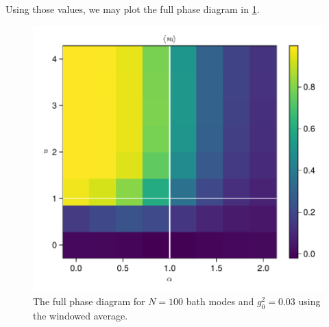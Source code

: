 \documentclass[fontsize=10pt,paper=b5,open=any,
twoside=no,toc=listof,toc=bibliography,headings=optiontohead,
captions=nooneline,captions=tableabove,english,DIV=15,numbers=noenddot,final,parskip=half-,
headinclude=true,footinclude=false,BCOR=0mm]{scrartcl}
\begin{document}
Using those values, we may plot the full phase diagram in \cref{fig:example_full_diag}.
\begin{figure}[H]
  \centering
  \includegraphics[width=.8\linewidth]{plots/example_full_diag}
  \caption{\label{fig:example_full_diag} The full phase diagram for
    \(N=100\) bath modes and \(g_{0}^{2}=0.03\) using the windowed
    average.}
\end{figure}

\printbibliography{}
\printacronyms{}
\end{document}
